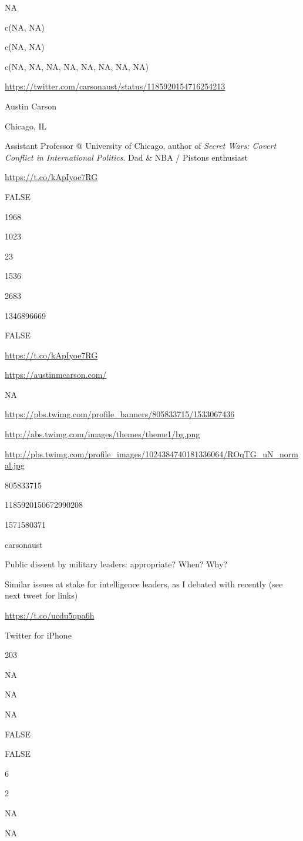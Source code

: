 \documentclass[]{book}
\begin{document}
NA

c(NA, NA)

c(NA, NA)

c(NA, NA, NA, NA, NA, NA, NA, NA)

\url{https://twitter.com/carsonaust/status/1185920154716254213}

Austin Carson

Chicago, IL

Assistant Professor @ University of Chicago, author of \emph{Secret
Wars: Covert Conflict in International Politics}. Dad \& NBA / Pistons
enthusiast

\url{https://t.co/kApIyoe7RG}

FALSE

1968

1023

23

1536

2683

1346896669

FALSE

\url{https://t.co/kApIyoe7RG}

\url{https://austinmcarson.com/}

NA

\url{https://pbs.twimg.com/profile_banners/805833715/1533067436}

\url{http://abs.twimg.com/images/themes/theme1/bg.png}

\url{http://pbs.twimg.com/profile_images/1024384740181336064/ROqTG_uN_normal.jpg}

805833715

1185920150672990208

1571580371

carsonaust

Public dissent by military leaders: appropriate? When? Why?

Similar issues at stake for intelligence leaders, as I debated with
\citet{JoshRovner1} recently (see next tweet for links)

\url{https://t.co/ucdu5qpa6h}

Twitter for iPhone

203

NA

NA

NA

FALSE

FALSE

6

2

NA

NA
\end{document}
